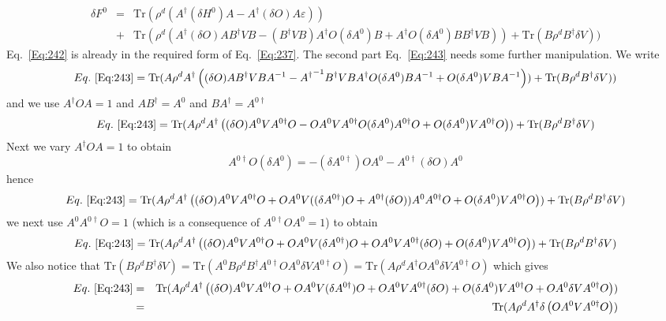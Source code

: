 \documentclass[aps,prb,floatfix,epsfig,singlecolumn,showpacs,preprintnumbers]{revtex4}
\newcommand{\Tr}{\mathrm{Tr}}
\begin{document}
\begin{eqnarray}
\delta F^0 &=& \Tr(\rho^d
\left(
{A^{\dagger}} (\delta H^0) {A} -
{A^{\dagger}} (\delta O) A \varepsilon
\right))
\label{Eq:242}\\
&+&\Tr(\rho^d \left(
{A^{\dagger}} (\delta O) A B^\dagger V B
-({B^\dagger} V B) A^{\dagger}O (\delta A^0) B 
+A^{\dagger} O  (\delta  A^0) B B^\dagger V B 
\right))+ 
\Tr(B \rho^d B^{\dagger} \delta V))
\label{Eq:243}
\end{eqnarray}
Eq.~\ref{Eq:242} is already in the required form of
Eq.~\ref{Eq:237}. The second part Eq.~\ref{Eq:243} needs some further manipulation.
%
We write
\begin{eqnarray}
Eq.~\ref{Eq:243}=
\Tr(A \rho^d A^\dagger \left(
 (\delta O) A B^\dagger V B A^{-1}
- {A^{\dagger}}^{-1} {B^\dagger} V B  A^{\dagger}O (\delta A^0) B A^{-1}
+O  (\delta  A^0) V B A^{-1}
\right))+ 
\Tr(B \rho^d B^{\dagger} \delta V))
\end{eqnarray}
and we use $A^\dagger O A=1$ and  $A B^\dagger=A^0$ and $B A^\dagger =A^{0\dagger}$
\begin{eqnarray}
Eq.~\ref{Eq:243}=
\Tr(A \rho^d A^\dagger \left(
 (\delta O) A^0 V A^{0\dagger} O
- O A^0 V A^{0 \dagger}O (\delta A^0) A^{0\dagger} O
+O  (\delta  A^0) V A^{0\dagger} O
\right))+ 
\Tr(B \rho^d B^{\dagger} \delta V)
\end{eqnarray}
Next we vary $A^\dagger O A=1$ to obtain
$$A^{0 \dagger}O (\delta A^0)=-(\delta A^{0 \dagger})O A^0-A^{0  \dagger}(\delta O) A^0$$
hence
\begin{eqnarray}
Eq.~\ref{Eq:243}=
\Tr(A \rho^d A^\dagger \left(
 (\delta O) A^0 V A^{0\dagger} O
+ O A^0 V 
((\delta A^{0 \dagger})O+A^{0  \dagger}(\delta O))
A^0 A^{0\dagger} O
+O  (\delta  A^0) V A^{0\dagger} O
\right))+ 
\Tr(B \rho^d B^{\dagger} \delta V)
\end{eqnarray}
we next use $A^0 A^{0\dagger} O=1$ (which is a consequence of $A^{0\dagger} O A^0=1$) to obtain
\begin{eqnarray}
Eq.~\ref{Eq:243}=
\Tr(A \rho^d A^\dagger \left(
 (\delta O) A^0 V A^{0\dagger} O
+ O A^0 V (\delta A^{0 \dagger})O
+ O A^0 V A^{0  \dagger}(\delta O)
+O  (\delta  A^0) V A^{0\dagger} O
\right))+ 
\Tr(B \rho^d B^{\dagger} \delta V)
\end{eqnarray}
We also notice that $\Tr(B \rho^d B^{\dagger} \delta V)=\Tr(A^0 B \rho^d B^{\dagger} A^{0\dagger} O A^0\delta V A^{0\dagger} O)=\Tr(A \rho^d A^{\dagger} O A^0\delta V A^{0\dagger} O)$
which gives
\begin{eqnarray}
Eq.~\ref{Eq:243}&=&
\Tr(A \rho^d A^\dagger \left(
 (\delta O) A^0 V A^{0\dagger} O
+ O A^0 V (\delta A^{0 \dagger})O
+ O A^0 V A^{0  \dagger}(\delta O)
+O  (\delta  A^0) V A^{0\dagger} O
+O A^0\delta V A^{0\dagger} O
\right))\nonumber\\
&=&\Tr(A \rho^d A^\dagger \delta\left(O A^0 V A^{0\dagger} O\right))
\end{eqnarray}
\end{document}
